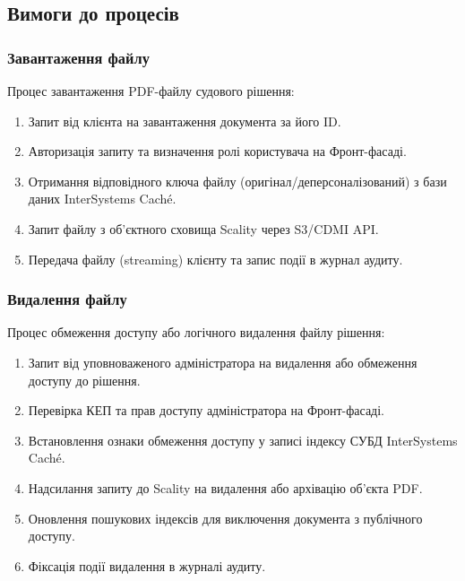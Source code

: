 \documentclass{article}
\begin{document}
\newpage
\subsection{Вимоги до процесів}

\subsubsection{Завантаження файлу}
Процес завантаження PDF-файлу судового рішення:
\begin{enumerate}
    \item Запит від клієнта на завантаження документа за його ID.
    \item Авторизація запиту та визначення ролі користувача на Фронт-фасаді.
    \item Отримання відповідного ключа файлу (оригінал/деперсоналізований) з бази даних InterSystems Caché.
    \item Запит файлу з об'єктного сховища Scality через S3/CDMI API.
    \item Передача файлу (streaming) клієнту та запис події в журнал аудиту.
\end{enumerate}

\subsubsection{Видалення файлу}
Процес обмеження доступу або логічного видалення файлу рішення:
\begin{enumerate}
    \item Запит від уповноваженого адміністратора на видалення або обмеження доступу до рішення.
    \item Перевірка КЕП та прав доступу адміністратора на Фронт-фасаді.
    \item Встановлення ознаки обмеження доступу у записі індексу СУБД InterSystems Caché.
    \item Надсилання запиту до Scality на видалення або архівацію об'єкта PDF.
    \item Оновлення пошукових індексів для виключення документа з публічного доступу.
    \item Фіксація події видалення в журналі аудиту.
\end{enumerate}
\end{document}
